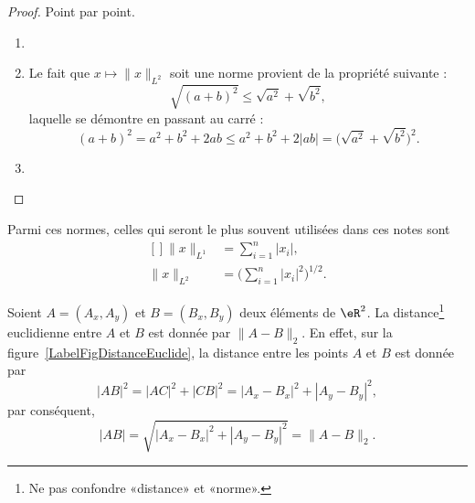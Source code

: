 \begin{proof}
    Point par point.
    \begin{enumerate}
        \item
        \item
    Le fait que \( x\mapsto\| x \|_{L^2}\) soit une norme provient de la propriété suivante :
    \begin{equation}
        \sqrt{ (a+b)^2 }\leq \sqrt{ a^2 }+\sqrt{ b^2 },
    \end{equation}
    laquelle se démontre en passant au carré :
    \begin{equation}        \label{EQooRYNYooTzZpPz}
        (a+b)^2=a^2+b^2+2ab\leq a^2+b^2+2| ab |=\big( \sqrt{ a^2 }+\sqrt{ b^2 } \big)^2.
    \end{equation}
\item
    \end{enumerate}
\end{proof}

Parmi ces normes, celles qui seront le plus souvent utilisées dans ces notes sont
\begin{equation}
	\begin{aligned}[]
		\| x \|_{L^1}&=\sum_{i=1}^n| x_i |,\\
		\| x \|_{L^2}&=\Big( \sum_{i=1}^n| x_i |^2 \Big)^{1/2}.
	\end{aligned}
\end{equation}

\newcommand{\CaptionFigDistanceEuclide}{La \emph{norme} euclidienne induit la \emph{distance} euclidienne. D'où son nom. Le point $C$ est construit aux coordonnées $(A_x,B_y)$.}


Soient $A=(A_x,A_y)$ et $B=(B_x,B_y)$ deux éléments de $\eR^2$. La distance\footnote{Ne pas confondre «distance» et «norme».} euclidienne entre $A$ et $B$ est donnée par $\| A-B \|_2$. En effet, sur la figure~\ref{LabelFigDistanceEuclide}, la distance entre les points $A$ et $B$ est donnée par
\begin{equation}
	| AB |^2=| AC |^2+| CB |^2=| A_x-B_x |^2+| A_y-B_y |^2,
\end{equation}
par conséquent,
\begin{equation}
	| AB |=\sqrt{| A_x-B_x |^2+| A_y-B_y |^2}=\| A-B \|_2.
\end{equation}

